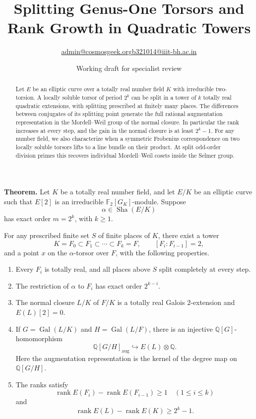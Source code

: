 \documentclass[11pt]{article}
\title{Splitting Genus-One Torsors and Rank Growth in Quadratic Towers}
\author{\small \href{mailto:admin@cosmosgeek.org}{admin@cosmosgeek.org}\qquad \href{mailto:b321014@iiit-bh.ac.in}{b321014@iiit-bh.ac.in}}
\date{Working draft for specialist review}
\newcommand{\Sha}{\mathop{\mathrm{Sha}}\nolimits}
\begin{document}
\maketitle
\begin{abstract}
Let $E$ be an elliptic curve over a totally real number field $K$ with
irreducible two-torsion. A locally soluble torsor of period $2^k$ can
be split in a tower of $k$ totally real quadratic extensions, with
splitting prescribed at finitely many places. The differences between
conjugates of its splitting point generate the full rational augmentation
representation in the Mordell--Weil group of the normal closure. In
particular the rank increases at every step, and the gain in the normal
closure is at least $2^k-1$. For any number field, we also characterize
when a symmetric Frobenius correspondence on two locally soluble torsors
lifts to a line bundle on their product. At split odd-order division primes
this recovers individual Mordell--Weil cosets inside the Selmer group.
\end{abstract}
\medskip
\noindent\textbf{Theorem.}
Let $K$ be a totally real number field, and let
$E/K$ be an elliptic curve such that $E[2]$ is an
irreducible $\mathbb F_2[G_K]$-module. Suppose
\[
\alpha\in\Sha(E/K)
\]
has exact order $m=2^k$, with $k\ge1$.

For any prescribed finite set $S$ of finite places
of $K$, there exist a tower
\[
K=F_0\subset F_1\subset\cdots\subset F_k=F,
\qquad [F_i:F_{i-1}]=2,
\]
and a point $x$ on the $\alpha$-torsor over $F$,
with the following properties.

\begin{enumerate}
\item Every $F_i$ is totally real, and all places
above $S$ split completely at every step.

\item The restriction of $\alpha$ to $F_i$ has
exact order $2^{k-i}$.

\item The normal closure $L/K$ of $F/K$ is a
totally real Galois $2$-extension and
$E(L)[2]=0$.

\item If $G=\operatorname{Gal}(L/K)$ and
$H=\operatorname{Gal}(L/F)$, there is an injective
$\mathbb Q[G]$-homomorphism
\[
\mathbb Q[G/H]_{\mathrm{aug}}
\hookrightarrow E(L)\otimes\mathbb Q.
\]
Here the augmentation representation is the
kernel of the degree map on $\mathbb Q[G/H]$.

\item The ranks satisfy
\[
\operatorname{rank}E(F_i)
-\operatorname{rank}E(F_{i-1})\ge1
\quad(1\le i\le k)
\]
and
\[
\operatorname{rank}E(L)-\operatorname{rank}E(K)
\ge2^k-1.
\]
\end{enumerate}
\end{document}
